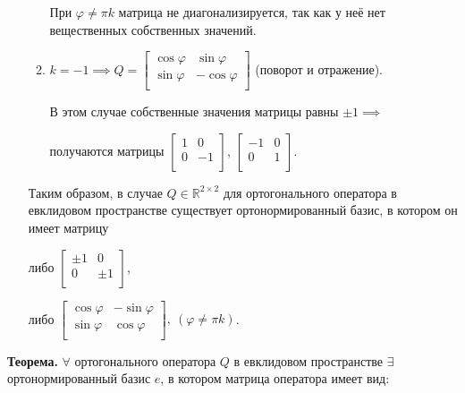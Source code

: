 \begin{itemize}
\begin{enumerate}
        При $\varphi \ne \pi k$ матрица не диагонализируется, так как у неё нет вещественных собственных значений.
            
        \item $k=-1 \implies 
            Q = \begin{bmatrix} 
                \cos\varphi & \sin\varphi \\
                \sin\varphi & -\cos\varphi \\
            \end{bmatrix}$ (поворот и отражение).
        
        В этом случае собственные значения матрицы равны $\pm1 \implies$ 
        
        получаются матрицы 
        $\begin{bmatrix} 
            1 & 0 \\
            0 & -1 \\
        \end{bmatrix}$, 
        $\begin{bmatrix} 
            -1 & 0 \\
            0 & 1 \\
        \end{bmatrix}$.
    \end{enumerate}
    Таким образом, в случае $Q \in \mathbb{R}^{2\times2}$ для ортогонального оператора в евклидовом пространстве существует ортонормированный базис, в котором он имеет матрицу 
    
    либо 
    $\begin{bmatrix} 
        \pm1 & 0 \\
        0 & \pm1 \\
    \end{bmatrix}$, 
    
    либо 
    $\begin{bmatrix} 
        \cos\varphi & -\sin\varphi \\
        \sin\varphi & \cos\varphi \\
    \end{bmatrix},~(\varphi\ne\pi k)$.
\end{itemize}

\textbf{Теорема.} $\forall$ ортогонального оператора $Q$ в евклидовом пространстве $\exists$ ортонормированный базис $e$, в котором матрица оператора имеет вид:

